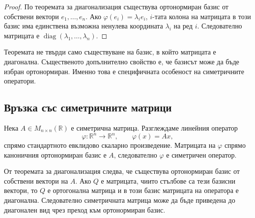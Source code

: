 \begin{proof}
По теоремата за диагонализация съществува ортонормиран базис от собствени вектори $e_1,\ldots,e_n$. Ако $\varphi(e_i)=\lambda_i e_i$, $i$-тата колона на матрицата в този базис има единствена възможна ненулева координата $\lambda_i$ на ред $i$. Следователно матрицата е $\operatorname{diag}(\lambda_1,\ldots,\lambda_n)$.
\end{proof}

\begin{remark}
Теоремата не твърди само съществуване на базис, в който матрицата е диагонална. Същественото допълнително свойство е, че базисът може да бъде избран ортонормиран. Именно това е специфичната особеност на симетричните оператори.
\end{remark}

\subsection{Връзка със симетричните матрици}\label{s:30.5.1}

Нека $A\in M_{n\times n}(\mathbb{R})$ е симетрична матрица. Разглеждаме линейния оператор
\[
\varphi:\mathbb{R}^n\to\mathbb{R}^n,
\qquad
\varphi(x)=Ax,
\]
спрямо стандартното евклидово скаларно произведение. Матрицата на $\varphi$ спрямо каноничния ортонормиран базис е $A$, следователно $\varphi$ е симетричен оператор.

От теоремата за диагонализация следва, че съществува ортонормиран базис от собствени вектори на $A$. Ако $Q$ е матрицата, чиито стълбове са тези базисни вектори, то $Q$ е ортогонална матрица и в този базис матрицата на оператора е диагонална. Следователно симетричната матрица може да бъде приведена до диагонален вид чрез преход към ортонормиран базис.

